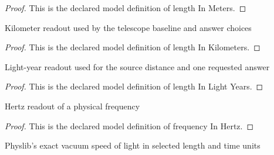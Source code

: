 \begin{proof}
  This is the declared model definition of length In Meters.
\end{proof}
\begin{definition}
  \label{def:physics:phyx-mini-0123:phyxminiproblems-problemphyxmini0123-lengthinkilometers}
  Kilometer readout used by the telescope baseline and answer choices
\end{definition}
\begin{proof}
  This is the declared model definition of length In Kilometers.
\end{proof}
\begin{definition}
  \label{def:physics:phyx-mini-0123:phyxminiproblems-problemphyxmini0123-lengthinlightyears}
  Light-year readout used for the source distance and one requested answer
\end{definition}
\begin{proof}
  This is the declared model definition of length In Light Years.
\end{proof}
\begin{definition}
  \label{def:physics:phyx-mini-0123:phyxminiproblems-problemphyxmini0123-frequencyinhertz}
  Hertz readout of a physical frequency
\end{definition}
\begin{proof}
  This is the declared model definition of frequency In Hertz.
\end{proof}
\begin{definition}
  \label{def:physics:phyx-mini-0123:phyxminiproblems-problemphyxmini0123-vacuumspeedoflightreadout}
  Physlib's exact vacuum speed of light in selected length and time units
\end{definition}
